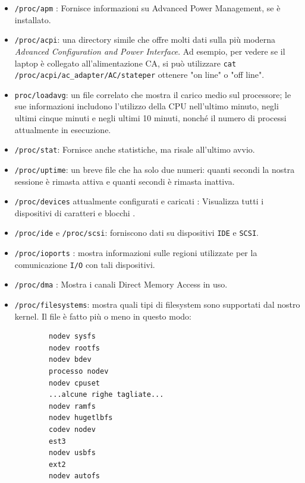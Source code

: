 \documentclass[11pt]{book}
\begin{document}
\begin{itemize}
	\item  \verb*|/proc/apm| : Fornisce informazioni su Advanced Power Management, se è installato.
	\item  \verb*|/proc/acpi|: una directory simile che offre molti dati sulla più moderna \textit{Advanced Configuration and Power Interface}. Ad esempio, per vedere se il laptop è collegato all'alimentazione CA, si può utilizzare  \verb*|cat /proc/acpi/ac_adapter/AC/stateper| ottenere "on line" o "off line". 
	\item \verb*|proc/loadavg|: un file correlato che mostra il carico medio sul processore; le sue informazioni includono l'utilizzo della CPU nell'ultimo minuto, negli ultimi cinque minuti e negli ultimi 10 minuti, nonché il numero di processi attualmente in esecuzione.
	\item \verb*|/proc/stat|: Fornisce anche statistiche, ma risale all'ultimo avvio.
	\item \verb*|/proc/uptime|: un breve file che ha solo due numeri: quanti secondi la nostra sessione è rimasta attiva e quanti secondi è rimasta inattiva.
	\item \verb*|/proc/devices| attualmente configurati e caricati : Visualizza tutti i dispositivi di caratteri e blocchi . 
	\item \verb*|/proc/ide| e \verb*|/proc/scsi|: forniscono dati su dispositivi \verb*|IDE| e \verb*|SCSI|.
	\item \verb*|/proc/ioports| : mostra informazioni sulle regioni utilizzate per la comunicazione \verb*|I/O| con tali dispositivi.
	\item \verb*|/proc/dma| : Mostra i canali Direct Memory Access in uso.
	\item \verb*|/proc/filesystems|: mostra quali tipi di filesystem sono supportati dal nostro kernel. Il file è fatto più o meno in questo modo:
	\begin{verbatim}
		nodev sysfs
		nodev rootfs
		nodev bdev
		processo nodev
		nodev cpuset
		...alcune righe tagliate...
		nodev ramfs
		nodev hugetlbfs
		codev nodev
		est3
		nodev usbfs
		ext2
		nodev autofs
	\end{verbatim}

\end{itemize}
\end{document}
